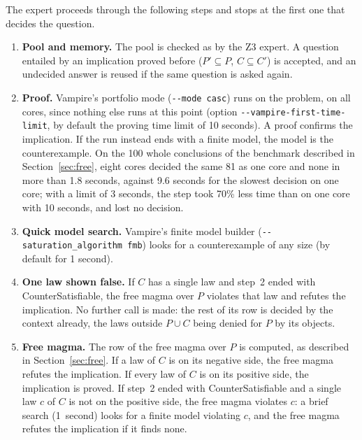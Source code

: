 \documentclass[11pt,a4paper]{article}
\theoremstyle{definition}
\theoremstyle{remark}
\newcommand{\code}[1]{\texttt{#1}}
\begin{document}
The expert proceeds through the following steps and stops at the first one that decides the question.
\begin{enumerate}
  \item \textbf{Pool and memory.} The pool is checked as by the Z3 expert. A question entailed by an implication proved before ($P' \subseteq P$, $C \subseteq C'$) is accepted, and an undecided answer is reused if the same question is asked again.
  \item \textbf{Proof.} Vampire's portfolio mode (\code{-{}-mode casc}) runs on the problem, on all cores, since nothing else runs at this point (option \code{-{}-vampire-first-time-limit}, by default the proving time limit of 10 seconds). A proof confirms the implication. If the run instead ends with a finite model, the model is the counterexample. On the 100 whole conclusions of the benchmark described in Section~\ref{sec:free}, eight cores decided the same 81 as one core and none in more than 1.8 seconds, against 9.6 seconds for the slowest decision on one core; with a limit of 3 seconds, the step took 70\% less time than on one core with 10 seconds, and lost no decision.
  \item \textbf{Quick model search.} Vampire's finite model builder (\code{-{}-saturation\_algorithm fmb}) looks for a counterexample of any size (by default for 1 second).
  \item \textbf{One law shown false.} If $C$ has a single law and step~2 ended with CounterSatisfiable, the free magma over $P$ violates that law and refutes the implication. No further call is made: the rest of its row is decided by the context already, the laws outside $P \cup C$ being denied for $P$ by its objects.
  \item \textbf{Free magma.} The row of the free magma over $P$ is computed, as described in Section~\ref{sec:free}. If a law of $C$ is on its negative side, the free magma refutes the implication. If every law of $C$ is on its positive side, the implication is proved. If step~2 ended with CounterSatisfiable and a single law $c$ of $C$ is not on the positive side, the free magma violates $c$: a brief search (1~second) looks for a finite model violating $c$, and the free magma refutes the implication if it finds none.

\end{enumerate}
\end{document}
